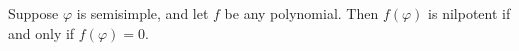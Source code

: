 Suppose $\varphi$ is semisimple, and let $f$ be any polynomial. Then $f(\varphi)$ is nilpotent if and only if $f(\varphi) = 0$.
